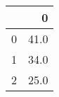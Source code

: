 \begin{tabular}{lr}
\toprule
{} &     0 \\
\midrule
0 &  41.0 \\
1 &  34.0 \\
2 &  25.0 \\
\bottomrule
\end{tabular}
